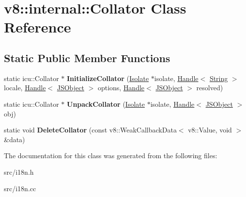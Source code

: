 \hypertarget{classv8_1_1internal_1_1_collator}{}\section{v8\+:\+:internal\+:\+:Collator Class Reference}
\label{classv8_1_1internal_1_1_collator}
\subsection*{Static Public Member Functions}
\begin{DoxyCompactItemize}
\item 
\hypertarget{classv8_1_1internal_1_1_collator_ac7bf407efae3cfa2bfc11818086e3ef0}{}static icu\+::\+Collator $\ast$ {\bfseries Initialize\+Collator} (\hyperlink{classv8_1_1internal_1_1_isolate}{Isolate} $\ast$isolate, \hyperlink{classv8_1_1internal_1_1_handle}{Handle}$<$ \hyperlink{classv8_1_1internal_1_1_string}{String} $>$ locale, \hyperlink{classv8_1_1internal_1_1_handle}{Handle}$<$ \hyperlink{classv8_1_1internal_1_1_j_s_object}{J\+S\+Object} $>$ options, \hyperlink{classv8_1_1internal_1_1_handle}{Handle}$<$ \hyperlink{classv8_1_1internal_1_1_j_s_object}{J\+S\+Object} $>$ resolved)\label{classv8_1_1internal_1_1_collator_ac7bf407efae3cfa2bfc11818086e3ef0}

\item 
\hypertarget{classv8_1_1internal_1_1_collator_a19c7973ff5c7de06271df8bf52b8dfe5}{}static icu\+::\+Collator $\ast$ {\bfseries Unpack\+Collator} (\hyperlink{classv8_1_1internal_1_1_isolate}{Isolate} $\ast$isolate, \hyperlink{classv8_1_1internal_1_1_handle}{Handle}$<$ \hyperlink{classv8_1_1internal_1_1_j_s_object}{J\+S\+Object} $>$ obj)\label{classv8_1_1internal_1_1_collator_a19c7973ff5c7de06271df8bf52b8dfe5}

\item 
\hypertarget{classv8_1_1internal_1_1_collator_aab1e9b6510389a727bde190225ad2916}{}static void {\bfseries Delete\+Collator} (const v8\+::\+Weak\+Callback\+Data$<$ v8\+::\+Value, void $>$ \&data)\label{classv8_1_1internal_1_1_collator_aab1e9b6510389a727bde190225ad2916}

\end{DoxyCompactItemize}


The documentation for this class was generated from the following files\+:\begin{DoxyCompactItemize}
\item 
src/i18n.\+h\item 
src/i18n.\+cc\end{DoxyCompactItemize}
